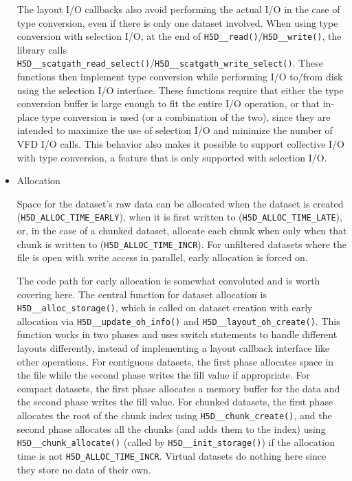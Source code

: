 \begin{itemize}
The layout I/O callbacks also avoid performing the actual I/O in the case of type conversion, even if there is only one dataset involved. When using type conversion with selection I/O, at the end of \texttt{H5D\_\_read()}/\texttt{H5D\_\_write()}, the library calls \\ \texttt{H5D\_\_scatgath\_read\_select()}/\texttt{H5D\_\_scatgath\_write\_select()}. These functions then implement type conversion while performing I/O to/from disk using the selection I/O interface. These functions require that either the type conversion buffer is large enough to fit the entire I/O operation, or that in-place type conversion is used (or a combination of the two), since they are intended to maximize the use of selection I/O and minimize the number of VFD I/O calls. This behavior also makes it possible to support collective I/O with type conversion, a feature that is only supported with selection I/O.

    \item Allocation

Space for the dataset's raw data can be allocated when the dataset is created (\texttt{H5D\_ALLOC\_TIME\_EARLY}), when it is first written to (\texttt{H5D\_ALLOC\_TIME\_LATE}), or, in the case of a chunked dataset, allocate each chunk when only when that chunk is written to (\texttt{H5D\_ALLOC\_TIME\_INCR}). For unfiltered datasets where the file is open with write access in parallel, early allocation is forced on.

The code path for early allocation is somewhat convoluted and is worth covering here. The central function for dataset allocation is \texttt{H5D\_\_alloc\_storage()}, which is called on dataset creation with early allocation via \texttt{H5D\_\_update\_oh\_info()} and \texttt{H5D\_\_layout\_oh\_create()}. This function works in two phases and uses switch statements to handle different layouts differently, instead of implementing a layout callback interface like other operations. For contiguous datasets, the first phase allocates space in the file while the second phase writes the fill value if appropriate. For compact datasets, the first phase allocates a memory buffer for the data and the second phase writes the fill value. For chunked datasets, the first phase allocates the root of the chunk index using \texttt{H5D\_\_chunk\_create()}, and the second phase allocates all the chunks (and adds them to the index) using \texttt{H5D\_\_chunk\_allocate()} (called by \texttt{H5D\_\_init\_storage()}) if the allocation time is not \texttt{H5D\_ALLOC\_TIME\_INCR}. Virtual datasets do nothing here since they store no data of their own.


\end{itemize}

